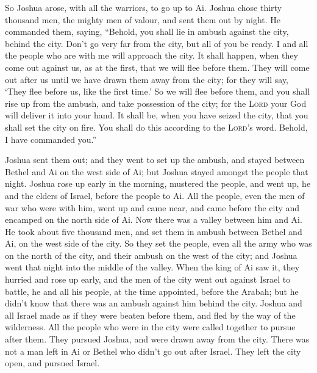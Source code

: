  So Joshua arose, with all the warriors, to go up to Ai.
Joshua chose thirty thousand men, the mighty men of valour, and sent
them out by night.  He commanded them, saying, ``Behold,
you shall lie in ambush against the city, behind the city. Don't go very
far from the city, but all of you be ready.  I and all the
people who are with me will approach the city. It shall happen, when
they come out against us, as at the first, that we will flee before
them.  They will come out after us until we have drawn
them away from the city; for they will say, `They flee before us, like
the first time.' So we will flee before them,  and you
shall rise up from the ambush, and take possession of the city; for the
\textsc{Lord} your God will deliver it into your hand.  It
shall be, when you have seized the city, that you shall set the city on
fire. You shall do this according to the \textsc{Lord}'s word. Behold, I
have commanded you.''

 Joshua sent them out; and they went to set up the ambush,
and stayed between Bethel and Ai on the west side of Ai; but Joshua
stayed amongst the people that night.  Joshua rose up
early in the morning, mustered the people, and went up, he and the
elders of Israel, before the people to Ai.  All the
people, even the men of war who were with him, went up and came near,
and came before the city and encamped on the north side of Ai. Now there
was a valley between him and Ai.  He took about five
thousand men, and set them in ambush between Bethel and Ai, on the west
side of the city.  So they set the people, even all the
army who was on the north of the city, and their ambush on the west of
the city; and Joshua went that night into the middle of the valley.
 When the king of Ai saw it, they hurried and rose up
early, and the men of the city went out against Israel to battle, he and
all his people, at the time appointed, before the Arabah; but he didn't
know that there was an ambush against him behind the city.
 Joshua and all Israel made as if they were beaten before
them, and fled by the way of the wilderness.  All the
people who were in the city were called together to pursue after them.
They pursued Joshua, and were drawn away from the city. 
There was not a man left in Ai or Bethel who didn't go out after Israel.
They left the city open, and pursued Israel.

